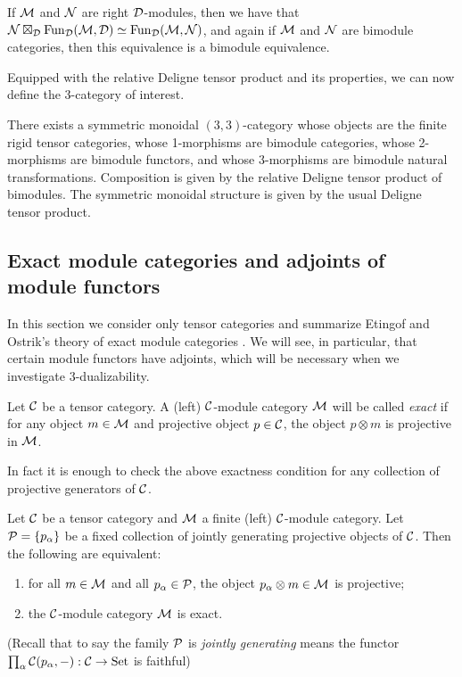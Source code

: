\documentclass{amsart}
\begin{document}
\begin{remark} \label{remark-tensorasfunctors}
If $\mathcal M$ and $\mathcal N$ are right $\mathcal D$-modules, then we have that $\mathcal N \boxtimes_\mathcal D \operatorname{Fun}_{\mathcal D}(\mathcal M,\mathcal D) \simeq \operatorname{Fun}_{\mathcal D}(\mathcal M,\mathcal N)$, and again if $\mathcal M$ and $\mathcal N$ are bimodule categories, then this equivalence is a bimodule equivalence. 
\end{remark}



Equipped with the relative Deligne tensor product and its properties, we can now define the 3-category of interest.

\begin{theorem}[\cite{3TC}]
	There exists a symmetric monoidal $(3,3)$-category whose objects are the finite rigid tensor categories, whose 1-morphisms are bimodule categories, whose 2-morphisms are bimodule functors, and whose 3-morphisms are bimodule natural transformations. Composition is given by the relative Deligne tensor product of bimodules. The symmetric monoidal structure is given by the usual Deligne tensor product. 
\end{theorem}

\subsection{Exact module categories and adjoints of module functors} \label{sec:tc-exact}
In this section we consider only tensor categories and summarize Etingof and Ostrik's theory of exact module categories \cite{MR2119143}.  We will see, in particular, that certain module functors have adjoints, which will be necessary when we investigate $3$-dualizability.

\begin{definition}
	Let $\mathcal C$ be a tensor category. A (left) $\mathcal C$-module category $\mathcal M$ will be called {\em exact} if for any object $m \in \mathcal M$ and  projective object $p \in \mathcal C$, the object $p \otimes m$ is projective in $\mathcal M$. 
\end{definition}

\noindent In fact it is enough to check the above exactness condition for any collection of projective generators of $\mathcal C$. 

\begin{lemma} \label{lma:Exact_checked_on_proj_gens}
	Let $\mathcal C$ be a tensor category and $\mathcal M$ a finite (left) $\mathcal C$-module category. Let $\mathcal P = \{ p_\alpha \}$ be a fixed collection of jointly generating projective objects of  $\mathcal C$. Then the following are equivalent:
	\begin{enumerate}
		\item for all $m \in \mathcal M$ and all $p_\alpha \in \mathcal P$, the object $p_\alpha \otimes m \in \mathcal M$ is projective;
		\item the $\mathcal C$-module category $\mathcal M$ is exact.
	\end{enumerate}
	(Recall that to say the family $\mathcal P$ is {\em jointly generating} means the functor $\prod_\alpha\mathcal C(p_\alpha, -): \mathcal C \to \mathrm{Set}$ is faithful)
\end{lemma}
\end{document}
